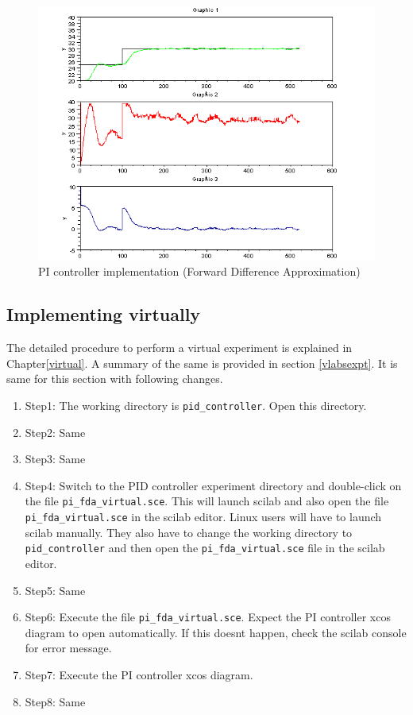\begin{figure}
\centering
\includegraphics[width=0.6\linewidth]{pid_manual/pi_fda}
\caption{PI controller implementation (Forward Difference Approximation)}
\label{pi_fda}
\end{figure}

\subsection{Implementing virtually}

The detailed procedure to perform a virtual experiment is explained in Chapter\ref{virtual}. A summary of the same is provided in section \ref{vlabsexpt}. It is same for this section with following changes.

\begin{enumerate}
\item Step1: The working directory is {\tt  pid\_controller}. Open this directory.
\item Step2: Same
\item Step3: Same
\item Step4:  Switch to the PID controller experiment directory and double-click on the file {\tt pi\_fda\_virtual.sce}. This will launch scilab and also open the file {\tt pi\_fda\_virtual.sce} in the scilab editor. Linux users will have to launch scilab manually. They also have to change the working directory to {\tt pid\_controller} and then open the {\tt  pi\_fda\_virtual.sce} file in the scilab editor.
\item Step5: Same
\item Step6: Execute the file {\tt pi\_fda\_virtual.sce}.  Expect the PI controller xcos diagram to open automatically. If this doesnt happen, check the scilab console for error message.
\item Step7: Execute the PI controller xcos diagram.
\item Step8: Same
\end{enumerate}


